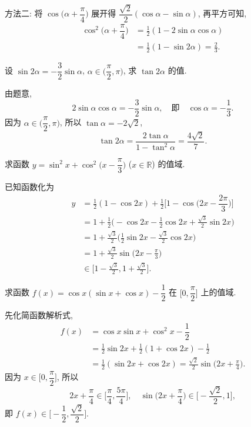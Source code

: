     方法二: 将 $\cos\Big(\alpha+ \dfrac\pi4\Big)$ 展开得 $\dfrac{\sqrt2}2(\cos\alpha- \sin\alpha)$, 再平方可知,
    \[\begin{aligned}
        \cos^2\Big(\alpha+ \dfrac\pi4\Big)
        &= \frac12(1-2\sin\alpha\cos\alpha)\\
        &= \frac12(1- \sin2\alpha)
         = \frac23.
    \end{aligned}\]
\endsolution

\begin{exercise}
    设 $\sin2\alpha= -\dfrac32\sin\alpha$, $\alpha\in\Big(\dfrac\pi2, \pi\Big)$, 求 $\tan2\alpha$ 的值.
\end{exercise}
\beginsolution
    由题意,
    \[2\sin\alpha\cos\alpha= -\dfrac32\sin\alpha,\quad
        \text{即}\quad \cos\alpha= -\frac13.\]
    因为 $\alpha\in\Big(\dfrac\pi2, \pi\Big)$, 所以 $\tan\alpha= -2\sqrt2$,
    \[\tan2\alpha= \frac{2\tan\alpha}{1- \tan^2\alpha}
        = \frac{4\sqrt2}{7}.\]
\endsolution

\begin{exercise}
    求函数 $y=\sin^2 x+\cos^2\Big(x-\dfrac\pi3\Big)$ 
    ($x\in\mathbb{R}$) 的值域.
\end{exercise}
\beginsolution
    已知函数化为
    \[\begin{aligned}
        y&= \frac12(1- \cos2x)+ \frac12\biggl[ 1
            - \cos\biggl(2x-\dfrac{2\pi}3\biggr)\biggr]\\
        &= 1+ \frac12\biggl(-\cos2x- \frac12\cos2x
            + \frac{\sqrt3}{2}\sin2x\biggr)\\
        &= 1+ \frac{\sqrt3}{2}\biggl(\frac12\sin2x
            - \frac{\sqrt3}{2}\cos2x\biggr)\\
        &= 1+ \frac{\sqrt3}{2}\sin\biggl(2x- \frac\pi3\biggr)\\
        &\in \biggl[1-\frac{\sqrt3}2, 1+\frac{\sqrt3}2\biggr].
    \end{aligned}\]
\endsolution

\begin{exercise}
    求函数 $f(x)=\cos x(\sin x+\cos x)- \dfrac12$ 在 $\biggl[0,\dfrac\pi2\biggr]$ 上的值域.
\end{exercise}
\beginsolution
    先化简函数解析式,
    \[\begin{aligned}
        f(x)&= \cos x\sin x+ \cos^2 x- \dfrac12\\
        &= \frac12\sin2x+ \frac12(1+\cos2x)- \frac12\\
        &= \frac12(\sin2x+ \cos2x)
         = \frac{\sqrt2}{2}\sin\biggl(2x+ \frac\pi4\biggr).
    \end{aligned}\]
    因为 $x\in\biggl[0,\dfrac\pi2\biggr]$, 所以
    \[2x+ \frac\pi4\in \biggl[\frac\pi4, \dfrac{5\pi}4\biggr],\quad 
    \sin\biggl(2x+ \frac\pi4\biggr)\in \biggl[-\frac{\sqrt2}2, 1\biggr],\]
    即 $f(x)\in \biggl[-\dfrac12, \dfrac{\sqrt2}2\biggr]$.


